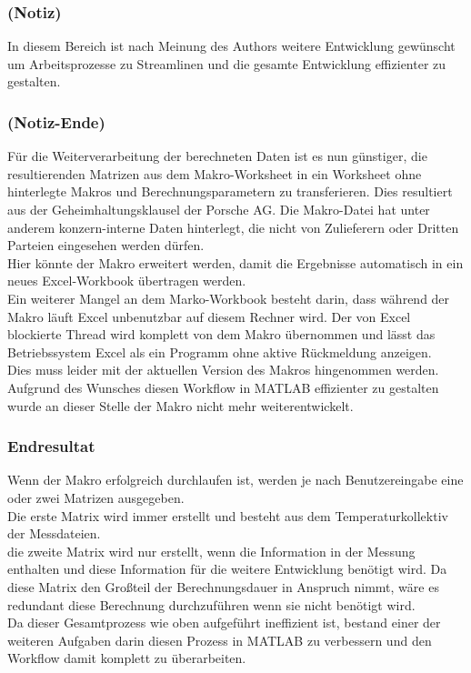 \newpage
\subsubsection*{(Notiz)}
\label{Note1}

In diesem Bereich ist nach Meinung des Authors weitere Entwicklung gewünscht um Arbeitsprozesse zu Streamlinen und die gesamte Entwicklung effizienter zu gestalten.

\subsubsection*{(Notiz-Ende)}

Für die Weiterverarbeitung der berechneten Daten ist es nun günstiger, die resultierenden Matrizen aus dem Makro-Worksheet in ein Worksheet ohne hinterlegte Makros und Berechnungsparametern zu transferieren. Dies resultiert aus der Geheimhaltungsklausel der Porsche AG. Die Makro-Datei hat unter anderem konzern-interne Daten hinterlegt, die nicht von Zulieferern oder Dritten Parteien eingesehen werden dürfen.\\
Hier könnte der Makro erweitert werden, damit die Ergebnisse automatisch in ein neues Excel-Workbook übertragen werden.\\

Ein weiterer Mangel an dem Marko-Workbook besteht darin, dass während der Makro läuft Excel unbenutzbar auf diesem Rechner wird. Der von Excel blockierte Thread wird komplett von dem Makro übernommen und lässt das Betriebssystem Excel als ein Programm ohne aktive Rückmeldung anzeigen. \\
Dies muss leider mit der aktuellen Version des Makros hingenommen werden.\\
Aufgrund des Wunsches diesen Workflow in MATLAB effizienter zu gestalten wurde an dieser Stelle der Makro nicht mehr weiterentwickelt. 

\subsubsection{Endresultat}
\label{Endresultat}

Wenn der Makro erfolgreich durchlaufen ist, werden je nach Benutzereingabe eine oder zwei Matrizen ausgegeben. \\
Die erste Matrix wird immer erstellt und besteht aus dem Temperaturkollektiv der Messdateien. \\
die zweite Matrix wird nur erstellt, wenn die Information in der Messung enthalten und diese Information für die weitere Entwicklung benötigt wird. Da diese Matrix den Großteil der Berechnungsdauer in Anspruch nimmt, wäre es redundant diese Berechnung durchzuführen wenn sie nicht benötigt wird.\\
Da dieser Gesamtprozess wie oben aufgeführt ineffizient ist, bestand einer der weiteren Aufgaben darin diesen Prozess in MATLAB zu verbessern und den Workflow damit komplett zu überarbeiten.

